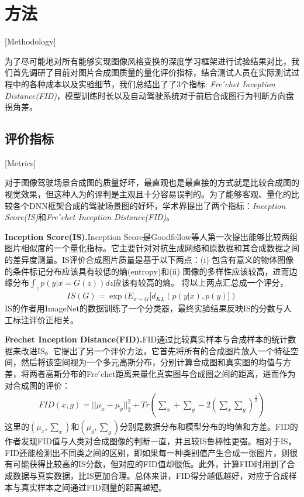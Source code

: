 \chapter{方法}[Methodology]

为了尽可能地对所有能够实现图像风格变换的深度学习框架进行试验结果对比，我们首先调研了目前对图片合成图质量的量化评价指标，结合测试人员在实际测试过程中的各种成本以及实验细节，我们总结出了了3个指标: \textit{Fre ́chet Inception Distance(FID)}\cite{FID}，模型训练时长以及自动驾驶系统对于前后合成图行为判断方向盘拐角差。

\section{评价指标}[Metrics]

对于图像驾驶场景合成图的质量好坏，最直观也是最直接的方式就是比较合成图的视觉效果，但这种人为的评判是主观且十分容易误判的。为了能够客观、量化的比较各个DNN框架合成的驾驶场景图的好坏，学术界提出了两个指标：\textit{Inception Score(IS)}\cite{IS}和\textit{Fre ́chet Inception Distance(FID)}\cite{FID}。

\textbf{Inception Score(IS).\cite{IS}}\quad Inception Score是Goodfellow等人第一次提出能够比较两组图片相似度的一个量化指标。它主要针对对抗生成网络和原数据和其合成数据之间的差异度测量。IS评价合成图片质量是基于以下两点：(i) 包含有意义的物体图像的条件标记分布应该具有较低的熵(entropy)和(ii) 图像的多样性应该较高，进而边缘分布$\int_z p(y|x=G(z))dz$应该有较高的熵。
将以上两点汇总成一个评分，
\begin{gather}
    IS(G)=\exp{(E_{x\sim G}[d_{KL}(p(y|x), p(y)])}
\end{gather}
IS的作者用ImageNet\cite{ImageNet}的数据训练了一个分类器，最终实验结果反映IS的分数与人工标注评价正相关。

\textbf{Frechet Inception Distance(FID).\cite{FID}}\quad FID通过比较真实样本与合成样本的统计数据来改进IS。它提出了另一个评价方法，它首先将所有的合成图片放入一个特征空间，然后将该空间视为一个多元高斯分布，分别计算合成图和真实图的均值与方差，将两者高斯分布的Fre ́chet距离来量化真实图与合成图之间的距离，进而作为对合成图的评价：
\begin{gather}
    FID(x,g)=||\mu_x-\mu_g||_2^2+Tr(\sum_x + \sum_g - 2(\sum_x\sum_g)^{\frac{1}{2}})
\end{gather}
这里的$(\mu_x,\sum_x)$和$(\mu_g,\sum_g)$分别是数据分布和模型分布的均值和方差。FID的作者发现FID值与人类对合成图像的判断一直，并且较IS\cite{IS}鲁棒性更强。相对于IS，FID还能检测出不同类之间的区别，即如果每一种类别值产生合成一张图片，则很有可能获得比较高的IS分数，但对应的FID值却很低。此外，计算FID时用到了合成数据与真实数据，比IS更加合理。总体来讲，FID得分越低越好，对应于合成样本与真实样本之间通过FID测量的距离越短。

